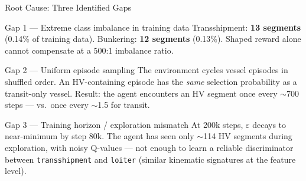 \documentclass[aspectratio=169,10pt]{beamer}
\begin{document}
\begin{frame}{Root Cause: Three Identified Gaps}
  \begin{block}{Gap 1 — Extreme class imbalance in training data}
    Transshipment: \textbf{13 segments} (0.14\% of training data).
    Bunkering: \textbf{12 segments} (0.13\%).
    Shaped reward alone cannot compensate at a 500:1 imbalance ratio.
  \end{block}

  \begin{block}{Gap 2 — Uniform episode sampling}
    The environment cycles vessel episodes in shuffled order.
    An HV-containing episode has the \emph{same} selection probability
    as a transit-only vessel. Result: the agent encounters an HV segment
    once every $\sim$700 steps — vs.\ once every $\sim$1.5 for transit.
  \end{block}

  \begin{block}{Gap 3 — Training horizon / exploration mismatch}
    At 200k steps, $\varepsilon$ decays to near-minimum by step 80k.
    The agent has seen only $\sim$114 HV segments during exploration,
    with noisy Q-values — not enough to learn a reliable discriminator
    between \texttt{transshipment} and \texttt{loiter} (similar kinematic
    signatures at the feature level).
  \end{block}
\end{frame}
\end{document}
